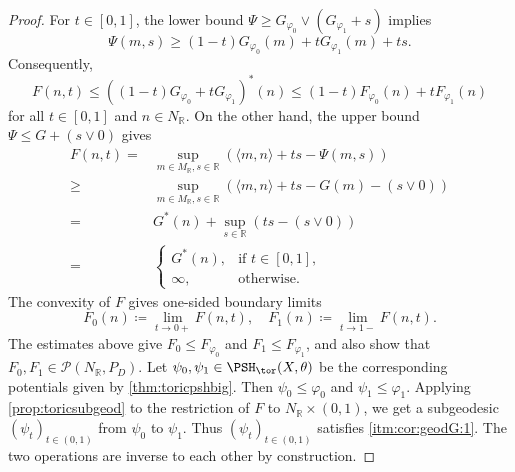 \begin{proof}
For $t\in[0,1]$, the lower bound $\Psi\geq G_{\varphi_0}\lor(G_{\varphi_1}+s)$ implies
\[
\Psi(m,s)\geq (1-t)G_{\varphi_0}(m)+tG_{\varphi_1}(m)+ts.
\]
Consequently,
\[
F(n,t)\leq \left((1-t)G_{\varphi_0}+tG_{\varphi_1}\right)^*(n)
\leq (1-t)F_{\varphi_0}(n)+tF_{\varphi_1}(n)
\]
for all $t\in [0,1]$ and $n\in N_{\mathbb{R}}$.
On the other hand, the upper bound $\Psi\leq G+(s\lor 0)$ gives
\[
\begin{aligned}
F(n,t)=&\sup_{m\in M_{\mathbb{R}},s\in \mathbb{R}} \left(\langle m,n\rangle +ts-\Psi(m,s)\right)\\
\geq & \sup_{m\in M_{\mathbb{R}},s\in \mathbb{R}} \left(\langle m,n\rangle +ts-G(m)-(s\lor 0)\right)\\
=& G^*(n)+\sup_{s\in \mathbb{R}} \left( ts-(s\lor 0)\right)\\
=&
\begin{cases}
    G^*(n),&\text{if }t\in [0,1],\\
    \infty,&\text{otherwise}.
\end{cases}
\end{aligned}
\]
The convexity of $F$ gives one-sided boundary limits
\[
F_0(n)\coloneqq \lim_{t\to 0+}F(n,t),\quad
F_1(n)\coloneqq \lim_{t\to 1-}F(n,t).
\]
The estimates above give $F_0\leq F_{\varphi_0}$ and $F_1\leq F_{\varphi_1}$, and also show that $F_0,F_1\in \mathcal{P}(N_{\mathbb{R}},P_D)$. Let $\psi_0,\psi_1\in \PSH_{\tor}(X,\theta)$ be the corresponding potentials given by \cref{thm:toricpshbig}. Then $\psi_0\leq\varphi_0$ and $\psi_1\leq\varphi_1$. Applying \cref{prop:toricsubgeod} to the restriction of $F$ to $N_{\mathbb{R}}\times (0,1)$, we get a subgeodesic $(\psi_t)_{t\in (0,1)}$ from $\psi_0$ to $\psi_1$. Thus $(\psi_t)_{t\in (0,1)}$ satisfies \ref{itm:cor:geodG:1}.
The two operations are inverse to each other by construction.
\end{proof}


